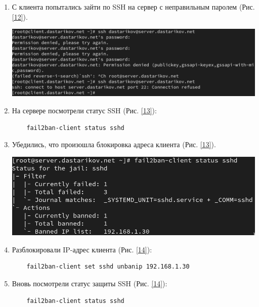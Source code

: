 \begin{enumerate}
\item С клиента попытались зайти по SSH на сервер с неправильным паролем (Рис. \ref{12}).

  \begin{center}
    \centering
    \includegraphics[width=\textwidth]{../images/image12.png}
    \label{12}
  \end{center}

\item На сервере посмотрели статус SSH (Рис. \ref{13}):
\begin{verbatim}
    fail2ban-client status sshd
\end{verbatim}

\item Убедились, что произошла блокировка адреса клиента (Рис. \ref{13}).

  \begin{center}
    \centering
    \includegraphics[width=\textwidth]{../images/image13.png}
    \label{13}
  \end{center}

\item Разблокировали IP-адрес клиента (Рис. \ref{14}):
\begin{verbatim}
    fail2ban-client set sshd unbanip 192.168.1.30
\end{verbatim}

\item Вновь посмотрели статус защиты SSH (Рис. \ref{14}):
\begin{verbatim}
    fail2ban-client status sshd
\end{verbatim}


\end{enumerate}
